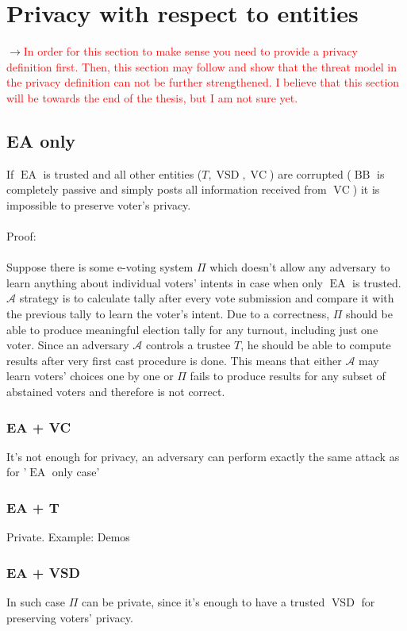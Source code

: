 \documentclass[12pt]{article}
\newcommand{\fix}[2]{\sout{#1}$\rightarrow$\textcolor{red}{#2}}
\DeclareMathOperator{\vsd}{VSD}
\DeclareMathOperator{\ea}{EA}
\DeclareMathOperator{\bb}{BB}
\DeclareMathOperator{\voc}{VC}
\begin{document}
\section{Privacy with respect to entities}
\fix{}{In order for this section to make sense you need to provide a privacy definition first. Then, this section may follow and show that the threat model in the privacy definition can not be further strengthened. I believe that this section will be towards the end of the thesis, but I am not sure yet.}
\subsection{EA only}
If $\ea$ is trusted and all other entities ($T,\vsd,\voc$) are corrupted ($\bb$ is completely passive and simply posts all information received from $\voc$) it is impossible to preserve voter's privacy. \\\\
Proof:\\\\
Suppose there is some e-voting system $\Pi$ which doesn't allow any adversary to learn anything about individual voters' intents in case when only $\ea$ is trusted. $\mathcal{A}$ strategy is to calculate tally after every vote submission and compare it with the previous tally to learn the voter's intent. Due to a correctness, $\Pi$ should be able to produce meaningful election tally for any turnout, including just one voter. Since an adversary $\mathcal{A}$ controls a trustee $T$, he should be able to compute results after very first cast procedure is done. This means that either $\mathcal{A}$  may learn voters' choices one by one or $\Pi$ fails to produce results for any subset of abstained voters  and therefore is not correct. 
\subsubsection{EA + VC}
 It's not enough for privacy, an adversary can perform exactly the same attack as for '$\ea$ only case'
\subsubsection{EA + T}
Private. Example: Demos 
\subsubsection{EA + VSD}
 In such case $\Pi$ can be private, since it's enough to have a trusted $\vsd$ for preserving voters' privacy.
\end{document}
